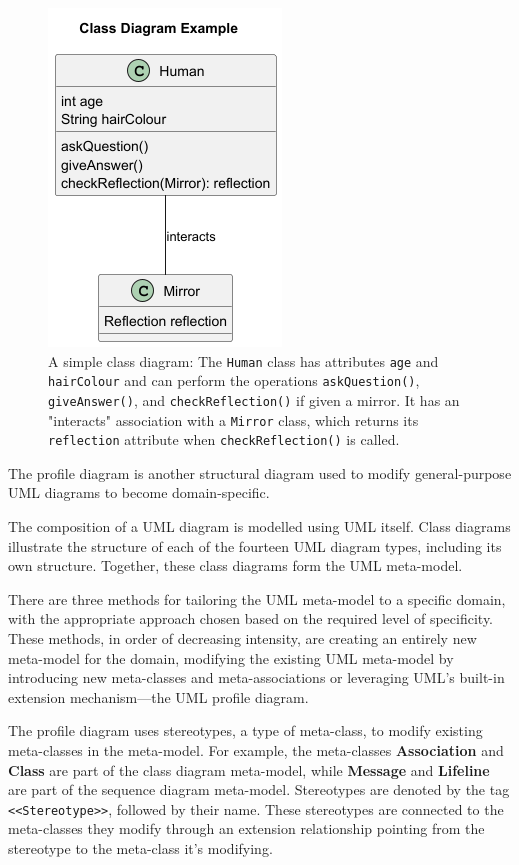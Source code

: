 \documentclass{article}
\newcounter{subsubsubsection}[subsubsection]
\begin{document}
{\begin{figure}[H]
    \centering
\includegraphics[width=0.4\linewidth]{CDexample-Class_Diagram_Example.png}
    \caption{A simple class diagram: The \texttt{Human} class has attributes \texttt{age} and \texttt{hairColour} and can perform the operations \texttt{askQuestion()}, \texttt{giveAnswer()}, and \texttt{checkReflection()} if given a mirror. It has an "interacts" association with a \texttt{Mirror} class, which returns its \texttt{reflection} attribute when \texttt{checkReflection()} is called.}
    \label{fig:Simple CD}
    \end{figure}


The profile diagram is another structural diagram used to modify general-purpose UML diagrams to become domain-specific.

The composition of a UML diagram is modelled using UML itself. Class diagrams illustrate the structure of each of the fourteen UML diagram types, including its own structure. Together, these class diagrams form the UML meta-model\cite{Seidl_Scholz_Huemer_Kappel_Duffy_2014}.

There are three methods for tailoring the UML meta-model to a specific domain, with the appropriate approach chosen based on the required level of specificity. These methods, in order of decreasing intensity, are creating an entirely new meta-model for the domain, modifying the existing UML meta-model by introducing new meta-classes and meta-associations or leveraging UML's built-in extension mechanism—the UML profile diagram\cite{Seidl_Scholz_Huemer_Kappel_Duffy_2014}.

The profile diagram uses stereotypes, a type of meta-class, to modify existing meta-classes in the meta-model. For example, the meta-classes \textbf{Association} and \textbf{Class} are part of the class diagram meta-model, while \textbf{Message} and \textbf{Lifeline} are part of the sequence diagram meta-model. Stereotypes are denoted by the tag \texttt{<<Stereotype>>}, followed by their name. These stereotypes are connected to the meta-classes they modify through an extension relationship pointing from the stereotype to the meta-class it's modifying\cite{Seidl_Scholz_Huemer_Kappel_Duffy_2014}.

}
\end{document}
